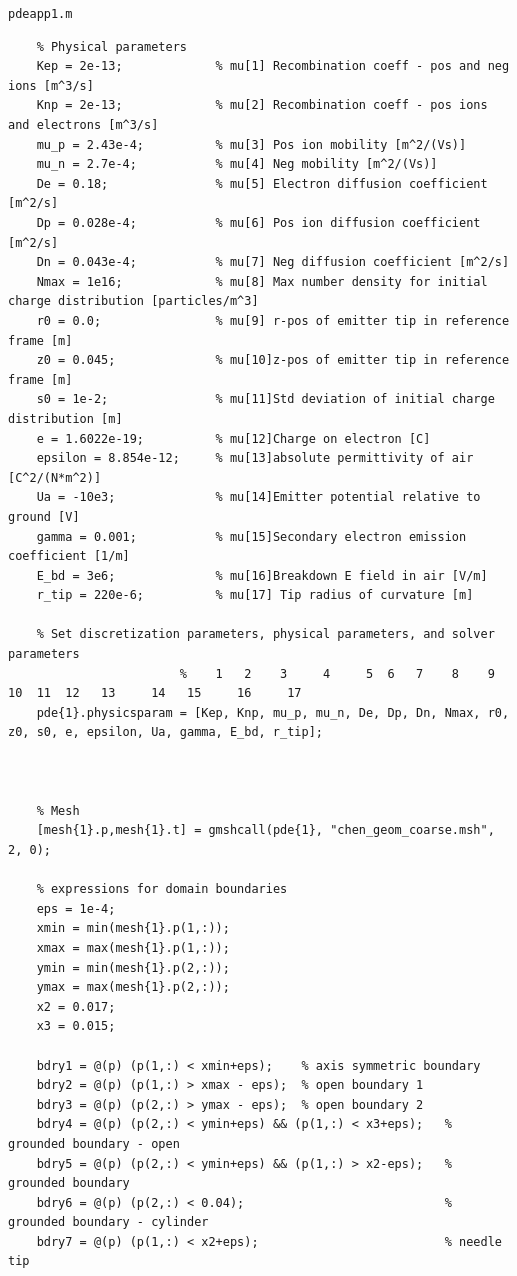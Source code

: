 \documentclass[12pt, a4paper]{report}
\begin{document}
\large \texttt{pdeapp1.m}
\begin{lstlisting}
    % Physical parameters
    Kep = 2e-13;             % mu[1] Recombination coeff - pos and neg ions [m^3/s]
    Knp = 2e-13;             % mu[2] Recombination coeff - pos ions and electrons [m^3/s]
    mu_p = 2.43e-4;          % mu[3] Pos ion mobility [m^2/(Vs)]
    mu_n = 2.7e-4;           % mu[4] Neg mobility [m^2/(Vs)]
    De = 0.18;               % mu[5] Electron diffusion coefficient [m^2/s]
    Dp = 0.028e-4;           % mu[6] Pos ion diffusion coefficient [m^2/s]
    Dn = 0.043e-4;           % mu[7] Neg diffusion coefficient [m^2/s]
    Nmax = 1e16;             % mu[8] Max number density for initial charge distribution [particles/m^3]
    r0 = 0.0;                % mu[9] r-pos of emitter tip in reference frame [m]
    z0 = 0.045;              % mu[10]z-pos of emitter tip in reference frame [m]
    s0 = 1e-2;               % mu[11]Std deviation of initial charge distribution [m]
    e = 1.6022e-19;          % mu[12]Charge on electron [C]
    epsilon = 8.854e-12;     % mu[13]absolute permittivity of air [C^2/(N*m^2)]
    Ua = -10e3;              % mu[14]Emitter potential relative to ground [V]
    gamma = 0.001;           % mu[15]Secondary electron emission coefficient [1/m]
    E_bd = 3e6;              % mu[16]Breakdown E field in air [V/m]
    r_tip = 220e-6;          % mu[17] Tip radius of curvature [m]

    % Set discretization parameters, physical parameters, and solver parameters
                        %    1   2    3     4     5  6   7    8    9   10  11  12   13     14   15     16     17
    pde{1}.physicsparam = [Kep, Knp, mu_p, mu_n, De, Dp, Dn, Nmax, r0, z0, s0, e, epsilon, Ua, gamma, E_bd, r_tip];



    % Mesh
    [mesh{1}.p,mesh{1}.t] = gmshcall(pde{1}, "chen_geom_coarse.msh", 2, 0);

    % expressions for domain boundaries
    eps = 1e-4;
    xmin = min(mesh{1}.p(1,:));
    xmax = max(mesh{1}.p(1,:));
    ymin = min(mesh{1}.p(2,:));
    ymax = max(mesh{1}.p(2,:));
    x2 = 0.017;
    x3 = 0.015;
    
    bdry1 = @(p) (p(1,:) < xmin+eps);    % axis symmetric boundary            
    bdry2 = @(p) (p(1,:) > xmax - eps);  % open boundary 1                                    
    bdry3 = @(p) (p(2,:) > ymax - eps);  % open boundary 2                                     
    bdry4 = @(p) (p(2,:) < ymin+eps) && (p(1,:) < x3+eps);   % grounded boundary - open                                       
    bdry5 = @(p) (p(2,:) < ymin+eps) && (p(1,:) > x2-eps);   % grounded boundary                                    
    bdry6 = @(p) (p(2,:) < 0.04);                            % grounded boundary - cylinder
    bdry7 = @(p) (p(1,:) < x2+eps);                          % needle tip          
    

\end{lstlisting}
\end{document}
